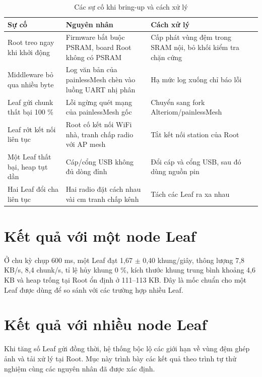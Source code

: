 \begin{table}[!htbp]
\centering
\caption{Các sự cố khi bring-up và cách xử lý}\label{tab:4.1}
{\fontsize{12}{14.5}\selectfont\renewcommand{\arraystretch}{1.25}
\begin{tabular}{|L{4.14cm}|L{5.16cm}|L{4.80cm}|}
\hline
\textbf{Sự cố} & \textbf{Nguyên nhân} & \textbf{Cách xử lý} \\
\hline
Root treo ngay khi khởi động & Firmware bắt buộc PSRAM, board Root không có PSRAM & Cấp phát vùng đệm trong SRAM nội, bỏ khối kiểm tra chặn cứng \\
\hline
Middleware bỏ qua nhiều byte & Log văn bản của painlessMesh chèn vào luồng UART nhị phân & Hạ mức log xuống chỉ báo lỗi \\
\hline
Leaf gửi chunk thất bại 100 \% & Lỗi ngừng quét mạng của painlessMesh gốc & Chuyển sang fork Alteriom/\allowbreak{}painlessMesh \\
\hline
Leaf rớt kết nối liên tục & Root cố kết nối WiFi nhà, tranh chấp radio với AP mesh & Tắt kết nối station của Root \\
\hline
Một Leaf thất bại, heap tụt dần & Cáp/\allowbreak{}cổng USB không đủ dòng đỉnh & Đổi cáp và cổng USB, sau đó dùng nguồn pin \\
\hline
Hai Leaf đổi cha liên tục & Hai radio đặt cách nhau vài cm tranh chấp kênh & Tách các Leaf ra xa nhau \\
\hline
\end{tabular}}
\end{table}


\section{Kết quả với một node Leaf}

Ở chu kỳ chụp 600 ms, một Leaf đạt 1,67 $\pm$ 0,40 khung/giây, thông lượng 7,8 KB/s, 8,4 chunk/s, tỉ lệ hủy khung 0 \%, kích thước khung trung bình khoảng 4,6 KB và heap trống tại Root ổn định ở 111–113 KB. Đây là mốc chuẩn cho một Leaf được dùng để so sánh với các trường hợp nhiều Leaf.


\section{Kết quả với nhiều node Leaf}

Khi tăng số Leaf gửi đồng thời, hệ thống bộc lộ các giới hạn về vùng đệm ghép ảnh và tải xử lý tại Root. Mục này trình bày các kết quả theo trình tự thử nghiệm cùng các nguyên nhân đã được xác định.


